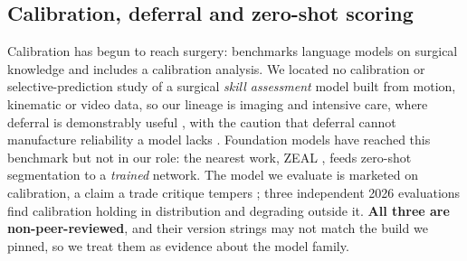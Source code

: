 \subsection{Calibration, deferral and zero-shot scoring}

Calibration has begun to reach surgery: \cite{surgiq2026} benchmarks language models on surgical knowledge and includes a calibration analysis. We located no calibration or selective-prediction study of a surgical \textit{skill assessment} model built from motion, kinematic or video data, so our lineage is imaging and intensive care, where deferral is demonstrably useful \cite{dvijotham2023codoc,zheng2024trust}, with the caution that deferral cannot manufacture reliability a model lacks \cite{calibratedtriage2026}. Foundation models have reached this benchmark but not in our role: the nearest work, ZEAL \cite{zeal}, feeds zero-shot segmentation to a \textit{trained} network. The model we evaluate is marketed on calibration, a claim a trade critique tempers \cite{eliot2026forbes}; three independent 2026 evaluations \cite{priorbench2026,scienthoon2026,webofmike2026} find calibration holding in distribution and degrading outside it. \textbf{All three are non-peer-reviewed}, and their version strings may not match the build we pinned, so we treat them as evidence about the model family.
